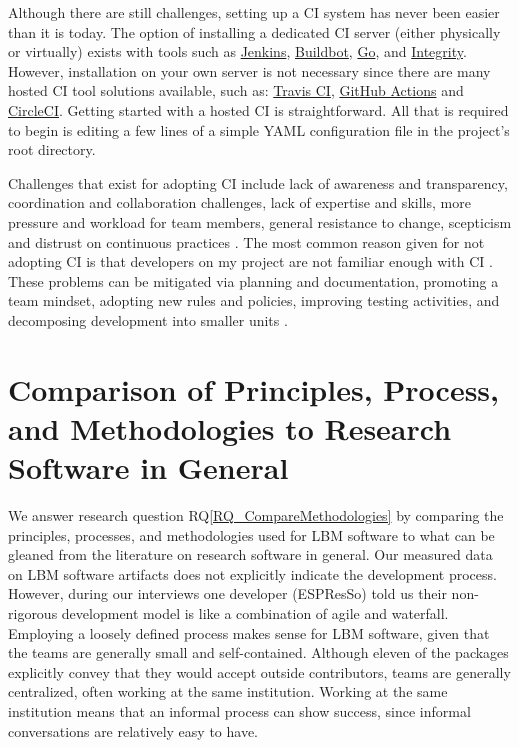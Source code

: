 \documentclass[final, 3p, times, authoryear]{elsarticle}
\newcommand{\rqref}[1]{RQ\ref{#1}}
\begin{document}
Although there are still challenges, setting up a CI system has never been
easier than it is today.  The option of installing a dedicated CI server (either
physically or virtually) exists with tools such as
\href{https://www.jenkins.io/} {Jenkins}, \href{http://buildbot.net/}
{Buildbot}, \href{https://www.gocd.org/} {Go}, and
\href{http://integrity.github.io/} {Integrity}. However, installation on your
own server is not necessary since there are many hosted CI tool solutions
available, such as: \href{https://travis-ci.org/} {Travis CI},
\href{https://github.com/features/actions} {GitHub Actions} and
\href{https://circleci.com/} {CircleCI}.  Getting started with a hosted CI is
straightforward.  All that is required to begin is editing a few lines of a
simple YAML configuration file in the project's root directory.

Challenges that exist for adopting CI include lack of awareness and
transparency, coordination and collaboration challenges, lack of expertise and
skills, more pressure and workload for team members, general resistance to
change, scepticism and distrust on continuous practices \citep{ShahinEtAl2017}.
The most common reason given for not adopting CI is that developers on my
project are not familiar enough with CI \citep{HiltonEtAl2016}.  These problems
can be mitigated via planning and documentation, promoting a team mindset,
adopting new rules and policies, improving testing activities, and decomposing
development into smaller units \citep{ShahinEtAl2017}.

\section{Comparison of Principles, Process, and Methodologies to Research Software in General} \label{Sec_CompareMethodologies}

We answer research question \rqref{RQ_CompareMethodologies} by comparing the
principles, processes, and methodologies used for LBM software to what can be
gleaned from the literature on research software in general. Our measured data
on LBM software artifacts does not explicitly indicate the development process.
However, during our interviews one developer (ESPResSo) told us their
non-rigorous development model is like a combination of agile and waterfall.
Employing a loosely defined process makes sense for LBM software, given that the
teams are generally small and self-contained.  Although eleven of the packages
explicitly convey that they would accept outside contributors, teams are
generally centralized, often working at the same institution. Working at the
same institution means that an informal process can show success, since informal
conversations are relatively easy to have.
\end{document}

